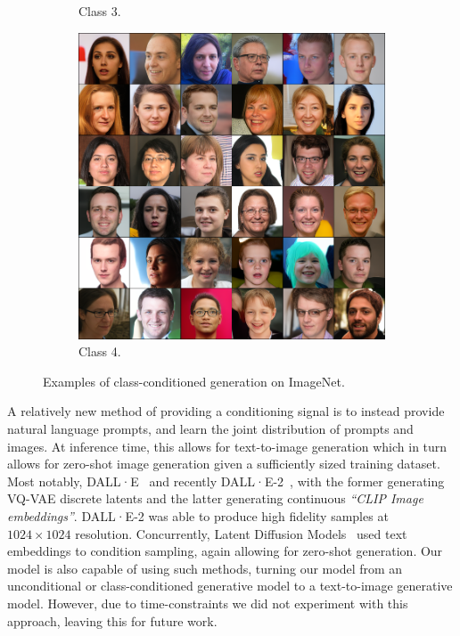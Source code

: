 \begin{figure}[ht]
\begin{subfigure}[b]{0.47\textwidth}
        \caption{
            Class 3.
        }
    \end{subfigure}
    \hfill
    \begin{subfigure}[b]{0.47\textwidth}
        \centering
        \includegraphics[width=1.0\textwidth]{figures/ffhq256-samples-small.png}
        \caption{
            Class 4.
        }
    \end{subfigure}
    \caption{Examples of class-conditioned generation on ImageNet.}
    \label{fig:imagenet}
\end{figure}

A relatively new method of providing a conditioning signal is to instead provide
natural language prompts, and learn the joint distribution of prompts and
images. At inference time, this allows for text-to-image generation which in
turn allows for zero-shot image generation given a sufficiently sized training
dataset. Most notably, DALL·E~\cite{ramesh2021dalle} and recently
DALL·E-2~\cite{ramesh2022dalle2}, with the former generating VQ-VAE discrete
latents and the latter generating continuous \textit{``CLIP Image embeddings''}.
DALL·E-2 was able to produce high fidelity samples at $1024 \times 1024$
resolution. Concurrently, Latent Diffusion
Models~\cite{rombach2021highresolution} used text embeddings to condition
sampling, again allowing for zero-shot generation. Our model is also capable of
using such methods, turning our model from an unconditional or class-conditioned
generative model to a text-to-image generative model. However, due to
time-constraints we did not experiment with this approach, leaving this for
future work.

